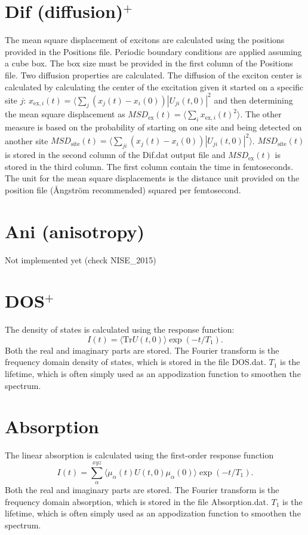 \section{Dif (diffusion)$^{+}$}
The mean square displacement of excitons are calculated using the positions provided in the Positions file. Periodic boundary conditions are applied assuming a cube box. The box size must be provided in the first column of the Positions file.
Two diffusion properties are calculated. The diffusion of the exciton center is calculated by calculating the center of the excitation given it started on a specific site $j$: $x_{\textrm{ex},i}(t)=\langle \sum_j (x_j(t)-x_i(0)) |U_{ji}(t,0)|^2$ and then determining the mean square displacement as $MSD_{\textrm{ex}}(t)=\langle \sum_i  x_{\textrm{ex},i}(t)^2\rangle$. The other measure is based on the probability of starting on one site and being detected on another site $MSD_{\textrm{site}}(t)=\langle \sum_{ji} (x_j(t)-x_i(0))|U_{ji}(t,0)|^2\rangle$. $MSD_{\textrm{site}}(t)$ is stored in the second column of the Dif.dat output file and $MSD_{\textrm{ex}}(t)$ is stored in the third column. The first column contain the time in femtoseconds. The unit for the mean square displacements is the distance unit provided on the position file (\AA ngstr\"{o}m recommended) squared per femtosecond. 
\section{Ani (anisotropy)}
Not implemented yet (check NISE\_2015)
\section{DOS$^{+}$}
The density of states is calculated using the response function:
\begin{equation}
	I(t)=\langle\textrm{Tr}U(t,0)\rangle\exp(-t/T_1).
\end{equation}
Both the real and imaginary parts are stored. The Fourier transform is the frequency domain density of states, which is stored in the file DOS.dat. $T_1$ is the lifetime, which is often simply used as an appodization function to smoothen the spectrum.
\section{Absorption}
The linear absorption is calculated using the first-order response function \cite{Duan_2015}
\begin{equation}
	I(t)=\sum_{\alpha}^{xyz}\langle\mu_{\alpha}(t)U(t,0)\mu_{\alpha}(0)\rangle\exp(-t/T_1).
\end{equation}
Both the real and imaginary parts are stored. The Fourier transform is the frequency domain absorption, which is stored in the file Absorption.dat. $T_1$ is the lifetime, which is often simply used as an appodization function to smoothen the spectrum. 
